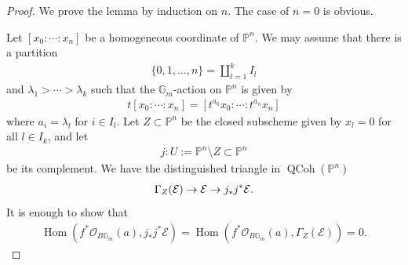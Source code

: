 \documentclass [11pt,oneside,a4paper,mathscr]{amsart}
\theoremstyle{definition}
\newcommand{\QCoh}{\operatorname{QCoh}}
\newcommand{\bgm}{B\mathbb{G}_m}
\newcommand{\Hom}{\operatorname{Hom}}
\begin{document}
\begin{proof}
    We prove the lemma by induction on $n$. 
    The case of $n=0$ is obvious. 

Let $[x_0 : \cdots : x_n]$ be a homogeneous coordinate 
of $\mathbb{P}^n$. We may assume that there is a 
partition 
\begin{align*}
\{0, 1, \ldots, n\}=\coprod_{l=1}^k I_l
    \end{align*}
    and $\lambda_1>\cdots>\lambda_k$ such that
    the $\mathbb{G}_m$-action on $\mathbb{P}^n$ is given by 
    \begin{align*}
        t[x_0: \cdots : x_n]=[t^{a_0}x_0: \cdots : t^{a_n}x_n]
    \end{align*}
    where $a_i=\lambda_l$ for $i\in I_l$. 
    Let 
    $Z \subset \mathbb{P}^n$ be the closed subscheme 
    given by $x_l=0$ for all $l\in I_k$, and let
    \begin{align*}
j \colon U:= \mathbb{P}^n \setminus Z
\subset \mathbb{P}^n        
    \end{align*}
    be its complement. 
We have the distinguished 
    triangle in $\QCoh(\mathbb{P}^n)$
    \begin{align}\notag
\Gamma_Z(\mathcal{E}) \to \mathcal{E} \to j_{\ast}j^{\ast}\mathcal{E}. 
            \end{align}
            It is enough to show that 
            \begin{align}\label{show:vanish}
                \Hom(f^{\ast}\mathcal{O}_{\bgm}(a), j_{\ast}j^{\ast}\mathcal{E})=\Hom(f^{\ast}\mathcal{O}_{\bgm}(a), \Gamma_Z(\mathcal{E}))=0. 
            \end{align}


\end{proof}
\end{document}
